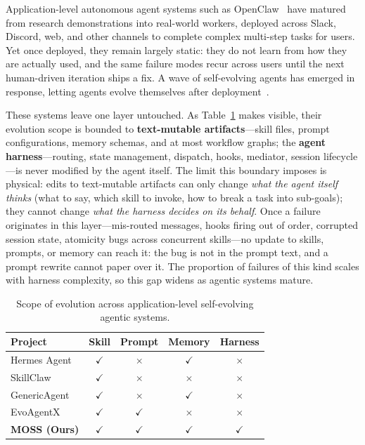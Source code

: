 \documentclass{article}
\begin{document}
Application-level autonomous agent systems such as OpenClaw~\citep{openclaw-github} have matured from research demonstrations into real-world workers, deployed across Slack, Discord, web, and other channels to complete complex multi-step tasks for users. Yet once deployed, they remain largely static: they do not learn from how they are actually used, and the same failure modes recur across users until the next human-driven iteration ships a fix. A wave of self-evolving agents has emerged in response, letting agents evolve themselves after deployment~\citep{hermes-github, hermes-self-evo, wang2026procedural, ma2026skillclaw, liang2026genericagent, wang2025evoagentx}.

These systems leave one layer untouched. As Table~\ref{tab:scope-comparison} makes visible, their evolution scope is bounded to \textbf{text-mutable artifacts}---skill files, prompt configurations, memory schemas, and at most workflow graphs; the \textbf{agent harness}---routing, state management, dispatch, hooks, mediator, session lifecycle---is never modified by the agent itself. The limit this boundary imposes is physical: edits to text-mutable artifacts can only change \emph{what the agent itself thinks} (what to say, which skill to invoke, how to break a task into sub-goals); they cannot change \emph{what the harness decides on its behalf}. Once a failure originates in this layer---mis-routed messages, hooks firing out of order, corrupted session state, atomicity bugs across concurrent skills---no update to skills, prompts, or memory can reach it: the bug is not in the prompt text, and a prompt rewrite cannot paper over it. The proportion of failures of this kind scales with harness complexity, so this gap widens as agentic systems mature.

\begin{table}[ht]
\caption{Scope of evolution across application-level self-evolving agentic systems.}
\label{tab:scope-comparison}
\centering
\small
\begin{tabular}{lcccc}
\toprule
Project & Skill & Prompt & Memory & Harness \\
\midrule
Hermes Agent~\citep{hermes-github}     & $\checkmark$ & $\times$              & $\checkmark$ & $\times$ \\
SkillClaw~\citep{ma2026skillclaw}            & $\checkmark$ & $\times$              & $\times$     & $\times$ \\
GenericAgent~\citep{liang2026genericagent}             & $\checkmark$ & $\times$              & $\checkmark$ & $\times$ \\
EvoAgentX~\citep{wang2025evoagentx}                 & $\checkmark$ & $\checkmark$          & $\times$     & $\times$ \\
\textbf{MOSS (Ours)}                             & \boldmath$\checkmark$ & \boldmath$\checkmark$ & \boldmath$\checkmark$ & \boldmath$\checkmark$ \\
\bottomrule
\end{tabular}
\end{table}
\end{document}
